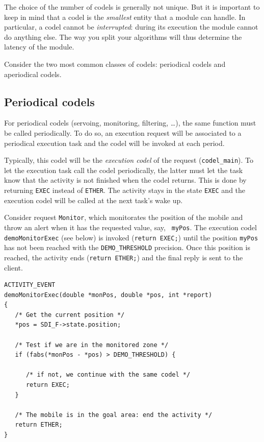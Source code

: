 The choice  of the number of  codels is generally  not unique.  But it is
important to keep in mind that a codel  is the {\em smallest} entity that
a module can handle. In particular, a  codel cannot be {\em interrupted}:
during  its execution the   module cannot do   anything else. The way you
split your algorithms will thus determine the latency of the module.

Consider  the two most  common classes of   codels: periodical codels and
aperiodical codels.

\subsection{Periodical codels}

For periodical codels (servoing, monitoring, filtering, \ldots), the same
function must be called periodically. To do so, an execution request will
be associated  to  a periodical  execution task  and  the  codel will  be
invoked at each period.

Typically, this codel  will be the {\em  execution codel} of the  request
({\tt  codel\_main}).  To let   the    execution task call   the  codel
periodically, the latter must let the task know that  the activity is not
finished  when the codel  returns.  This is done  by returning {\tt EXEC}
instead  of {\tt ETHER}.  The activity stays  in the state {\tt EXEC} and
the execution codel will be called at the next task's wake up.

Consider request {\tt Monitor},   which monitorates the position   of the
mobile and  throw an  alert when it   has the requested value, say,  {\tt
myPos}.  The  execution codel  {\tt  demoMonitorExec} (see below)  is invoked
({\tt return EXEC;}) until the position {\tt myPos}  has not been reached
with the {\tt DEMO\_THRESHOLD} precision. Once  this position is reached,
the activity ends ({\tt return  ETHER;}) and the  final reply is sent  to
the client.

\begin{center}\begin{cartouche}\small\begin{verbatim}
ACTIVITY_EVENT
demoMonitorExec(double *monPos, double *pos, int *report)
{
   /* Get the current position */
   *pos = SDI_F->state.position;

   /* Test if we are in the monitored zone */
   if (fabs(*monPos - *pos) > DEMO_THRESHOLD) {

      /* if not, we continue with the same codel */
      return EXEC;
   }

   /* The mobile is in the goal area: end the activity */
   return ETHER;
}
\end{verbatim}\end{cartouche}\end{center}

